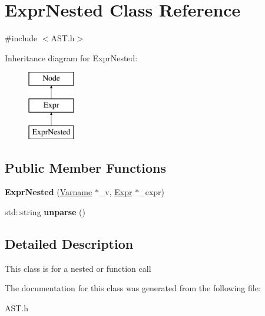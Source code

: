 \hypertarget{classExprNested}{\section{Expr\-Nested Class Reference}
\label{classExprNested}
}


{\ttfamily \#include $<$A\-S\-T.\-h$>$}

Inheritance diagram for Expr\-Nested\-:\begin{figure}[H]
\begin{center}
\leavevmode
\includegraphics[height=3.000000cm]{classExprNested}
\end{center}
\end{figure}
\subsection*{Public Member Functions}
\begin{DoxyCompactItemize}
\item 
\hypertarget{classExprNested_a0aa61624ac4528977c3d797715f2a710}{{\bfseries Expr\-Nested} (\hyperlink{classVarname}{Varname} $\ast$\-\_\-v, \hyperlink{classExpr}{Expr} $\ast$\-\_\-expr)}\label{classExprNested_a0aa61624ac4528977c3d797715f2a710}

\item 
\hypertarget{classExprNested_ae896b532fe8b1fd25c0e4d4765458d45}{std\-::string {\bfseries unparse} ()}\label{classExprNested_ae896b532fe8b1fd25c0e4d4765458d45}

\end{DoxyCompactItemize}


\subsection{Detailed Description}
This class is for a nested or function call 

The documentation for this class was generated from the following file\-:\begin{DoxyCompactItemize}
\item 
A\-S\-T.\-h\end{DoxyCompactItemize}
